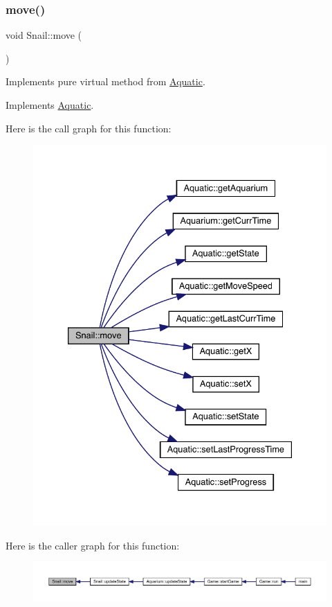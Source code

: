 \subsubsection{\texorpdfstring{move()}{move()}}
{\footnotesize\ttfamily void Snail\+::move (\begin{DoxyParamCaption}{ }\end{DoxyParamCaption})\hspace{0.3cm}{\ttfamily [virtual]}}



Implements pure virtual method from \mbox{\hyperlink{class_aquatic}{Aquatic}}. 



Implements \mbox{\hyperlink{class_aquatic_a962e93c804814eeaf3cea6e26698eef7}{Aquatic}}.

Here is the call graph for this function\+:\nopagebreak
\begin{figure}[H]
\begin{center}
\leavevmode
\includegraphics[width=333pt]{class_snail_af5892ec122d9199480c813b74488256b_cgraph}
\end{center}
\end{figure}
Here is the caller graph for this function\+:\nopagebreak
\begin{figure}[H]
\begin{center}
\leavevmode
\includegraphics[width=350pt]{class_snail_af5892ec122d9199480c813b74488256b_icgraph}
\end{center}
\end{figure}
\mbox{\label{class_snail_a21ebc352e8884cd36a1733aafb731944}} 
